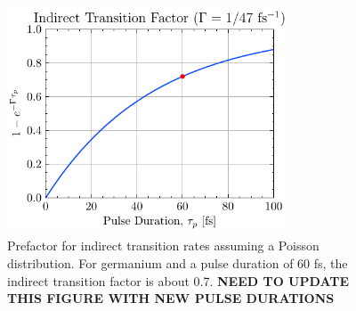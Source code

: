 \begin{figure}
	\centering
	\includegraphics[width=0.75\textwidth]{figures/chap4/Indirect_transition_factor.pdf}
	\caption{Prefactor for indirect transition rates assuming a Poisson distribution. For germanium and a pulse duration of 60 fs, the indirect transition factor is about 0.7. \textbf{NEED TO UPDATE THIS FIGURE WITH NEW PULSE DURATIONS}}
	\label{fig:Indirect_transition_factor}
\end{figure}

